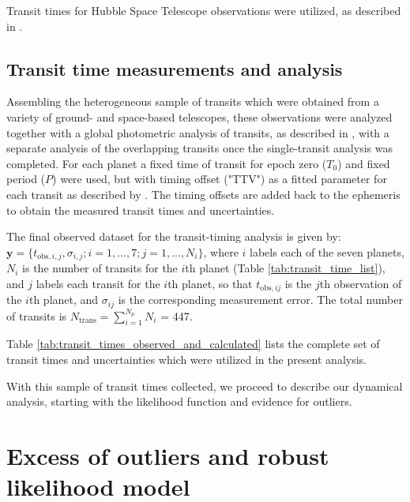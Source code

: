 \documentclass[fleqn,usenatbib]{mnras} %
\begin{document}
Transit times for Hubble Space Telescope observations were utilized, as described in \citet{Grimm2018,deWit2016,deWit2018,Wakeford2018}.

\subsection{Transit time measurements and analysis}\label{sec:transit_time_measurements}


Assembling the heterogeneous sample of transits which were obtained from a variety of ground- and space-based telescopes,  these observations were analyzed together
with a global photometric analysis of transits, as described in 
\citet{Ducrot2020}, with a separate analysis of the overlapping transits once the single-transit analysis was completed.
For each planet a fixed time of transit for epoch zero ($T_{0}$) and fixed period ($P$) were used, but with timing offset ("TTV") as a fitted parameter for each transit as described by \cite{Ducrot2020}.  The timing offsets are added back
to the ephemeris to obtain the measured transit times and uncertainties.

The final observed dataset for the transit-timing analysis
is given by: $\mathbf{y} = \{t_{\mathrm{obs},i,j},\sigma_{i,j}; i=1,...,7; j = 1,...,N_i\}$, where $i$ labels each of the seven planets, $N_i$ is
the number of transits for the $i$th planet (Table \ref{tab:transit_time_list}),
and $j$ labels each transit for the $i$th planet, so that
$t_{\mathrm{obs},ij}$ is the $j$th observation of the $i$th planet, and
$\sigma_{ij}$ is the corresponding measurement error.  The total number of transits is $N_\mathrm{trans} = \sum_{i=1}^{N_p} N_i$ = 447.

Table \ref{tab:transit_times_observed_and_calculated} lists the complete set
of transit times and uncertainties which were utilized in the present analysis.

With this sample of transit times collected, we proceed to describe our
dynamical analysis, starting with the likelihood function and evidence for outliers.

\section{Excess of outliers and robust likelihood model} \label{sec:outliers}
\end{document}
